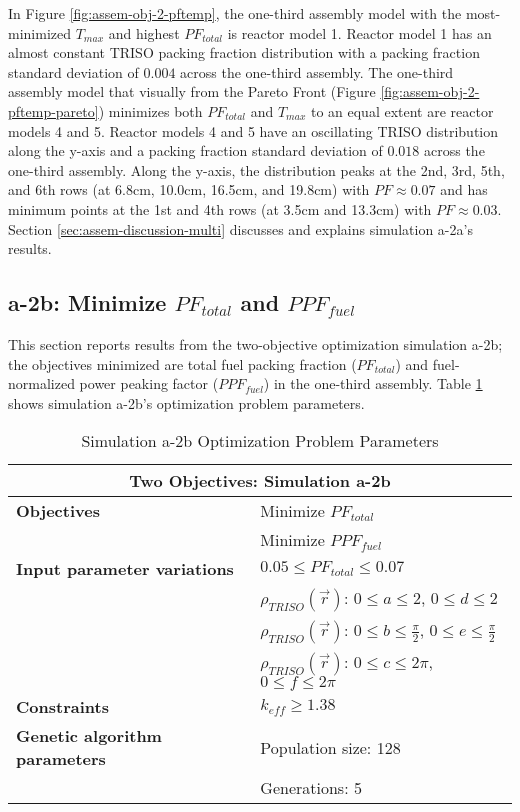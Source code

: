 In Figure \ref{fig:assem-obj-2-pftemp}, the one-third assembly model with the 
most-minimized $T_{max}$ and highest $PF_{total}$ is reactor model 1. 
Reactor model 1 has an almost constant TRISO packing fraction distribution with 
a packing fraction standard deviation of $0.004$ across the one-third assembly. 
The one-third assembly model that visually from the Pareto Front (Figure 
\ref{fig:assem-obj-2-pftemp-pareto}) minimizes both $PF_{total}$ and $T_{max}$ 
to an equal extent are reactor models 4 and 5. 
Reactor models 4 and 5 have an oscillating TRISO distribution along the y-axis and 
a packing fraction standard deviation of $0.018$ across the one-third assembly. 
Along the y-axis, the distribution peaks at the 2nd, 3rd, 5th, and 6th rows 
(at 6.8cm, 10.0cm, 16.5cm, and 19.8cm) with $PF\approx0.07$ and has minimum points at 
the 1st and 4th rows (at 3.5cm and 13.3cm) with $PF\approx0.03$. 
Section \ref{sec:assem-discussion-multi} discusses and explains simulation a-2a's 
results.

\subsection{a-2b: Minimize $PF_{total}$ and $PPF_{fuel}$}
\label{sec:a-2b}
This section reports results from the two-objective optimization simulation a-2b; the 
objectives minimized are total fuel packing fraction ($PF_{total}$) and fuel-normalized 
power peaking factor ($PPF_{fuel}$) in the one-third assembly.  
Table \ref{tab:simulationa2b} shows simulation a-2b's optimization problem parameters. 
\begin{table}[htbp!]
    \centering
    \onehalfspacing
    \caption{Simulation a-2b Optimization Problem Parameters}
	\label{tab:simulationa2b}
    \footnotesize
    \begin{tabular}{l|p{5.3cm}}
    \hline 
    \multicolumn{2}{c}{\textbf{Two Objectives: Simulation a-2b}} \\
    \hline 
    \textbf{Objectives} & Minimize $PF_{total}$ \\
    & Minimize $PPF_{fuel}$ \\
    \hline 
    \textbf{Input parameter variations} & $0.05 \leq PF_{total} \leq 0.07$ \\
    & $\rho_{TRISO}(\vec{r})$: $0 \leq a \leq 2$, $0 \leq d \leq 2$\\
    & $\rho_{TRISO}(\vec{r})$: $0 \leq b \leq \frac{\pi}{2}$, $0 \leq e \leq \frac{\pi}{2}$\\
    & $\rho_{TRISO}(\vec{r})$: $0 \leq c \leq 2\pi$, $0 \leq f \leq 2\pi$\\
    \hline
    \textbf{Constraints} & $k_{eff} \geq 1.38$\\ 
    \hline 
    \textbf{Genetic algorithm parameters} & Population size: 128 \\
    & Generations: 5 \\
    \hline
    \end{tabular}
\end{table}

